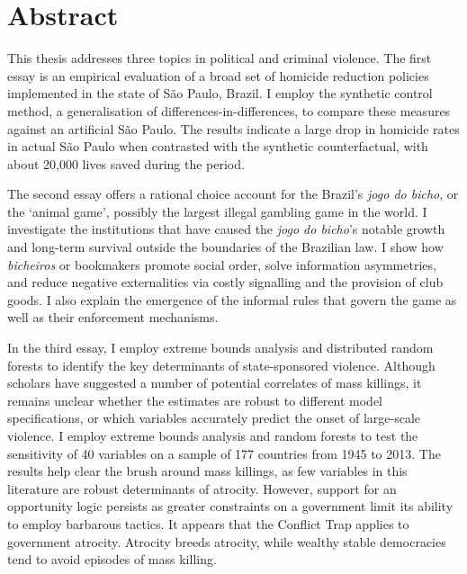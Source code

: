 \documentclass[a4paper,12pt]{report}
\newcommand{\linespacing}{2}
\renewcommand{\baselinestretch}{\linespacing}
\begin{document}
\chapter*{Abstract}
\renewcommand{\baselinestretch}{\linespacing}
\small\normalsize

This thesis addresses three topics in political and criminal violence. The first essay is an empirical evaluation of a broad set of homicide reduction policies implemented in the state of São Paulo, Brazil. I employ the synthetic control method, a generalisation of differences-in-differences, to compare these measures against an artificial São Paulo. The results indicate a large drop in homicide rates in actual São Paulo when contrasted with the synthetic counterfactual, with about 20,000 lives saved during the period. 

The second essay offers a rational choice account for the Brazil's \textit{jogo do bicho}, or the `animal game', possibly the largest illegal gambling game in the world. I investigate the institutions that have caused the \textit{jogo do bicho}'s notable growth and long-term survival outside the boundaries of the Brazilian law. I show how \textit{bicheiros} or bookmakers promote social order, solve information asymmetries, and reduce negative externalities via costly signalling and the provision of club goods. I also explain the emergence of the informal rules that govern the game as well as their enforcement mechanisms. 

In the third essay, I employ extreme bounds analysis and distributed random forests to identify the key determinants of state-sponsored violence. Although scholars have suggested a number of potential correlates of mass killings, it remains unclear whether the estimates are robust to different model specifications, or which variables accurately predict the onset of large-scale violence. I employ extreme bounds analysis and random forests to test the sensitivity of 40 variables on a sample of 177 countries from 1945 to 2013. The results help clear the brush around mass killings, as few variables in this literature are robust determinants of atrocity. However, support for an opportunity logic persists as greater constraints on a government limit its ability to employ barbarous tactics. It appears that the Conflict Trap applies to government atrocity. Atrocity breeds atrocity, while wealthy stable democracies tend to avoid episodes of mass killing.
\end{document}
